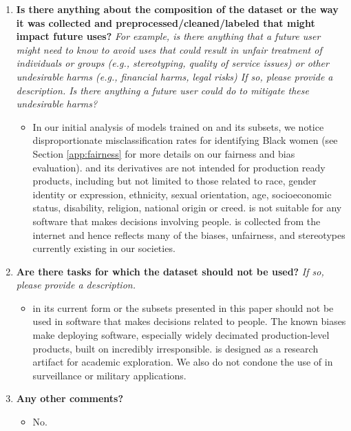 \begin{enumerate}[label=Q\arabic*]
\item \textbf{Is there anything about the composition of the dataset or the way it was collected and preprocessed/cleaned/labeled that might impact future uses?} \textit{For example, is there anything that a future user might need to know to avoid uses that could result in unfair treatment of individuals or groups (e.g., stereotyping, quality of service issues) or other undesirable harms (e.g., financial harms, legal risks) If so, please provide a description. Is there anything a future user could do to mitigate these undesirable harms?}

\begin{itemize}
\item In our initial analysis of models trained on \pool and its subsets, we notice disproportionate misclassification rates for identifying Black women (see Section \ref{app:fairness} for more details on our fairness and bias evaluation). \pool and its derivatives are not intended for production ready products, including but not limited to those related to race, gender identity or expression, ethnicity, sexual orientation, age, socioeconomic status, disability, religion, national origin or creed. \pool is not suitable for any software that makes decisions involving people. \pool is collected from the internet and hence reflects many of the biases, unfairness, and stereotypes currently existing in our societies. 
\end{itemize}

\item \textbf{Are there tasks for which the dataset should not be used?} \textit{If so, please provide a description.}
\begin{itemize}
\item \pool in its current form or the subsets presented in this paper should not be used in software that makes decisions related to people. The known biases make deploying software, especially widely decimated production-level products, built on \pool incredibly irresponsible. \pool is designed as a research artifact for academic exploration. We also do not condone the use of \pool in surveillance or military applications.
\end{itemize}

\item \textbf{Any other comments?}

\begin{itemize}
\item No.
\end{itemize}


\end{enumerate}
